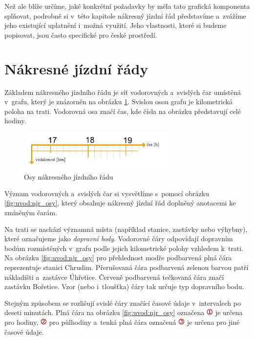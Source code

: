 Než ale blíže určíme, jaké konkrétní požadavky by měla tato grafická komponenta splňovat, podrobně si v~této kapitole nákresný jízdní řád představíme a~zvážíme jeho existující uplatnění i~možná využití. Jeho vlastnosti, které si budeme popisovat, jsou často specifické pro české prostředí.

\section{Nákresné jízdní řády}
\label{kap:uvod:nakresny_jizdni_rad}

Základem nákresného jízdního řádu je síť vodorovných a~svislých čar umístěná v~grafu, který je znázorněn na obrázku \ref{fig:uvod:njr_graf}. Svislou osou grafu je kilometrická poloha na trati. Vodorovná osa značí čas, kde čísla na obrázku představují celé hodiny.

\begin{figure}[ht]
	\centering
	\includegraphics[width=0.7\textwidth]{../img/kap1_njr_graf}
	\caption{Osy nákresného jízdního řádu}
	\label{fig:uvod:njr_graf}
\end{figure}

Význam vodorovných a~svislých čar si vysvětlíme s~pomocí obrázku \ref{fig:uvod:njr_osy}, který obsahuje nákresný jízdní řád doplněný anotacemi ke zmíněným čarám.

Na trati se nachází významná místa (například stanice, zastávky nebo výhybny), které označujeme jako \textit{dopravní body}. Vodorovné čáry odpovídají dopravním bodům rozmístěných v~grafu podle jejich kilometrické polohy vzhledem k~trati. Na obrázku \ref{fig:uvod:njr_osy} pro přehlednost modře podbarvená plná čára reprezentuje stanici Chrudim. Přerušovaná čára podbarvená zelenou barvou patří nákladišti a~zastávce Úhřetice. Červeně podbarvená tečkovaná čára značí zastávku Bořetice. Vzor (nebo i~tloušťka) čáry tak určuje typ dopravního bodu.

Stejným způsobem se rozlišují svislé čáry značící časové údaje v~intervalech po deseti minutách. Plná čára na obrázku \ref{fig:uvod:njr_osy} označena \includegraphics[height=10.0pt]{../img/cas_osa_typ_1} je určena pro hodiny, \includegraphics[height=10.0pt]{../img/cas_osa_typ_2} pro půlhodiny a~tenká plná čára označená \includegraphics[height=10.0pt]{../img/cas_osa_typ_3} je určena pro jiné časové údaje.

